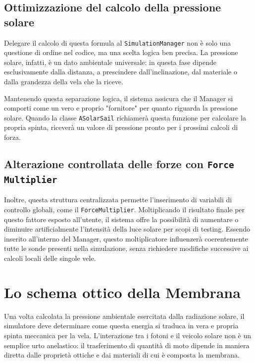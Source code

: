 
\subsection{Ottimizzazione del calcolo della pressione solare}

Delegare il calcolo di questa formula al \lstinline|SimulationManager| non è solo una questione di ordine nel codice, ma una scelta logica ben precisa. La pressione solare, infatti, è un dato ambientale universale: in questa fase dipende esclusivamente dalla distanza, a prescindere dall'inclinazione, dal materiale o dalla grandezza della vela che la riceve.

Mantenendo questa separazione logica, il sistema assicura che il Manager si comporti come un vero e proprio "fornitore" per quanto riguarda la pressione solare. Quando la classe \lstinline|ASolarSail| richiamerà questa funzione per calcolare la propria spinta, riceverà un valore di pressione pronto per i prossimi calcoli di forza.

\subsection{Alterazione controllata delle forze con \texttt{Force Multiplier}}

Inoltre, questa struttura centralizzata permette l'inserimento di variabili di controllo globali, come il \lstinline|ForceMultiplier|. Moltiplicando il risultato finale per questo fattore esposto all'utente, il sistema offre la possibilità di aumentare o diminuire artificialmente l'intensità della luce solare per scopi di testing. Essendo inserito all'interno del Manager, questo moltiplicatore influenzerà coerentemente tutte le sonde presenti nella simulazione, senza richiedere modifiche successive ai calcoli locali delle singole vele.


\section{Lo schema ottico della Membrana}

Una volta calcolata la pressione ambientale esercitata dalla radiazione solare, il simulatore deve determinare come questa energia si traduca in vera e propria spinta meccanica per la vela. L'interazione tra i fotoni e il veicolo solare non è un semplice urto anelastico: il trasferimento di quantità di moto dipende in maniera diretta dalle proprietà ottiche e dai materiali di cui è composta la membrana.

